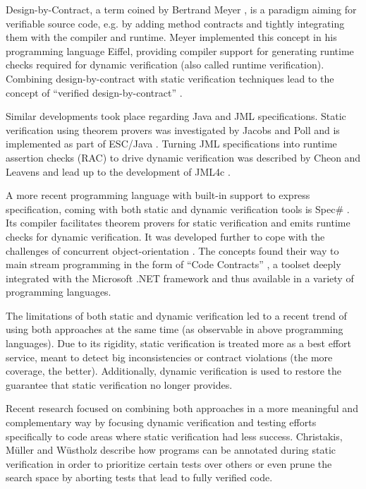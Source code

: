 Design-by-Contract, a term coined by Bertrand Meyer \cite{meyer2002design}, is a paradigm aiming for verifiable source code, e.g. by adding method contracts and tightly integrating them with the compiler and runtime.
Meyer implemented this concept in his programming language Eiffel, providing compiler support for generating runtime checks required for dynamic verification (also called runtime verification).
Combining design-by-contract with static verification techniques lead to the concept of “verified design-by-contract” \cite{crocker2004safe}.

Similar developments took place regarding Java and JML specifications.
Static verification using theorem provers was investigated by Jacobs and Poll \cite{jacobs2001logic} and is implemented as part of ESC/Java \cite{nelson2004extended}.
Turning JML specifications into runtime assertion checks (RAC) to drive dynamic verification was described by Cheon and Leavens \cite{cheon2002runtime} and lead up to the development of JML4c \cite{sarcar2010new}.

A more recent programming language with built-in support to express specification, coming with both static and dynamic verification tools is Spec\# \cite{the-spec-programming-system-an-overview}.
Its compiler facilitates theorem provers for static verification and emits runtime checks for dynamic verification.
It was developed further to cope with the challenges of concurrent object-orientation \cite{a-statically-verifiable-programming-model-for-concurrent-object-oriented-programs}.
The concepts found their way to main stream programming in the form of “Code Contracts” \cite{embedded-contract-languages}, a toolset deeply integrated with the Microsoft .NET framework and thus available in a variety of programming languages.

The limitations of both static and dynamic verification led to a recent trend of using both approaches at the same time (as observable in above programming languages).
Due to its rigidity, static verification is treated more as a best effort service, meant to detect big inconsistencies or contract violations (the more coverage, the better).
Additionally, dynamic verification is used to restore the guarantee that static verification no longer provides.

Recent research focused on combining both approaches in a more meaningful and complementary way by focusing dynamic verification and testing efforts specifically to code areas where static verification had less success.
Christakis, Müller and Wüstholz \cite{ChristakisMuellerWuestholz16} describe how programs can be annotated during static verification in order to prioritize certain tests over others or even prune the search space by aborting tests that lead to fully verified code.

